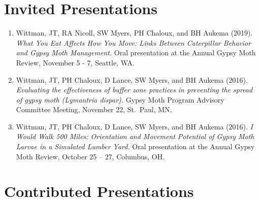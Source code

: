 \documentclass[11pt, a4paper]{awesome-cv}
\providecommand{\tightlist}{%
	\setlength{\itemsep}{0pt}\setlength{\parskip}{0pt}}
\begin{document}
\nocite{Short,
Wittman2019,
Stivers2019,
Wittman2018,
Wittman2017,
Wittman2013}

\hypertarget{invited-presentations}{%
\section{Invited Presentations}\label{invited-presentations}}

\begin{enumerate}
\def\labelenumi{\arabic{enumi}.}
\tightlist
\item
  Wittman, JT, RA Nicoll, SW Myers, PH Chaloux, and BH Aukema (2019). \emph{What You Eat Affects How You Move: Links Between Caterpillar Behavior and Gypsy Moth Management.} Oral presentation at the Annual Gypsy Moth Review, November 5 - 7, Seattle, WA.
\item
  Wittman, JT, PH Chaloux, D Lance, SW Myers, and BH Aukema (2016). \emph{Evaluating the effectiveness of buffer zone practices in preventing the spread of gypsy moth (Lymantria dispar).} Gypsy Moth Program Advisory Committee Meeting, November 22, St.~Paul, MN.
\item
  Wittman, JT, PH Chaloux, D Lance, SW Myers, and BH Aukema (2016). \emph{I Would Walk 500 Miles: Orientation and Movement Potential of Gypsy Moth Larvae in a Simulated Lumber Yard.} Oral presentation at the Annual Gypsy Moth Review, October 25 -- 27, Columbus, OH.
\end{enumerate}

\hypertarget{contributed-presentations}{%
\section{Contributed Presentations}\label{contributed-presentations}}
\end{document}

